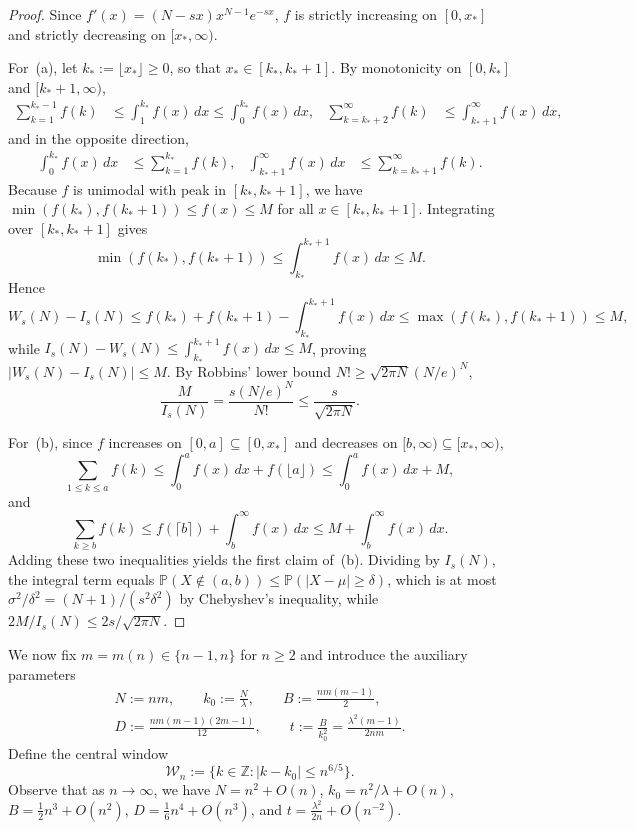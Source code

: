 \documentclass[11pt,a4paper]{article}
\theoremstyle{remark}
\begin{document}
\begin{proof}
Since $f'(x) = (N - sx)x^{N-1}e^{-sx}$, $f$ is strictly increasing on $[0,x_*]$ and strictly decreasing on $[x_*,\infty)$.

For~(a), let $k_* := \lfloor x_* \rfloor \ge 0$, so that $x_*\in [k_*, k_*+1]$. By monotonicity on $[0,k_*]$ and $[k_*+1,\infty)$,
\begin{align*}
  \sum_{k=1}^{k_*-1} f(k) &\le \int_1^{k_*} f(x)\,dx \le \int_0^{k_*} f(x)\,dx,
  &
  \sum_{k=k_*+2}^{\infty} f(k) &\le \int_{k_*+1}^{\infty} f(x)\,dx,
\end{align*}
and in the opposite direction,
\begin{align*}
  \int_0^{k_*} f(x)\,dx &\le \sum_{k=1}^{k_*} f(k),
  &
  \int_{k_*+1}^{\infty} f(x)\,dx &\le \sum_{k=k_*+1}^{\infty} f(k).
\end{align*}
Because $f$ is unimodal with peak in $[k_*, k_*+1]$, we have $\min(f(k_*),f(k_*+1)) \le f(x) \le M$ for all $x\in [k_*, k_*+1]$. Integrating over $[k_*,k_*+1]$ gives
\[
  \min(f(k_*),f(k_*+1)) \le \int_{k_*}^{k_*+1} f(x)\,dx \le M.
\]
Hence
\[
  W_s(N) - I_s(N) \le f(k_*) + f(k_*+1) - \int_{k_*}^{k_*+1} f(x)\,dx
  \le \max(f(k_*),f(k_*+1)) \le M,
\]
while $I_s(N) - W_s(N) \le \int_{k_*}^{k_*+1} f(x)\,dx \le M$, proving $|W_s(N) - I_s(N)| \le M$. By Robbins' lower bound $N! \ge \sqrt{2\pi N}(N/e)^N$,
\[
  \frac{M}{I_s(N)} = \frac{s(N/e)^N}{N!} \le \frac{s}{\sqrt{2\pi N}}.
\]

For~(b), since $f$ increases on $[0,a]\subseteq [0,x_*]$ and decreases on $[b,\infty)\subseteq [x_*,\infty)$,
\[
  \sum_{1\le k\le a} f(k) \le \int_0^{a} f(x)\,dx + f(\lfloor a\rfloor) \le \int_0^{a} f(x)\,dx + M,
\]
and
\[
  \sum_{k\ge b} f(k) \le f(\lceil b\rceil) + \int_{b}^{\infty} f(x)\,dx \le M + \int_{b}^{\infty} f(x)\,dx.
\]
Adding these two inequalities yields the first claim of~(b). Dividing by $I_s(N)$, the integral term equals $\mathbb{P}(X\notin (a,b)) \le \mathbb{P}(|X-\mu|\ge \delta)$, which is at most $\sigma^2/\delta^2 = (N+1)/(s^2\delta^2)$ by Chebyshev's inequality, while $2M/I_s(N) \le 2s/\sqrt{2\pi N}$.
\end{proof}

We now fix $m = m(n) \in \{n-1, n\}$ for $n\ge 2$ and introduce the auxiliary parameters
\begin{gather*}
  N := nm, \qquad
  k_0 := \frac{N}{\lambda}, \qquad
  B := \frac{nm(m-1)}{2},\\
  D := \frac{nm(m-1)(2m-1)}{12}, \qquad
  t := \frac{B}{k_0^2} = \frac{\lambda^2(m-1)}{2nm}.
\end{gather*}
Define the central window
\[
  \mathcal{W}_n := \bigl\{k\in\mathbb{Z} : |k - k_0| \le n^{6/5}\bigr\}.
\]
Observe that as $n\to\infty$, we have $N = n^2 + O(n)$, $k_0 = n^2/\lambda + O(n)$, $B = \tfrac{1}{2}n^3 + O(n^2)$, $D = \tfrac{1}{6}n^4 + O(n^3)$, and $t = \frac{\lambda^2}{2n} + O(n^{-2})$.
\end{document}
